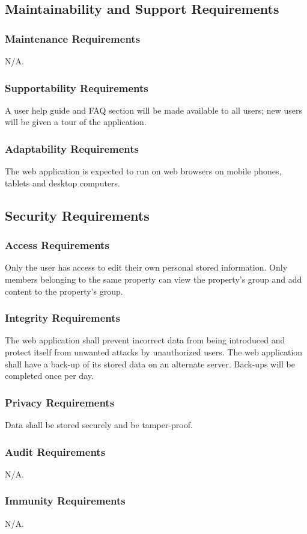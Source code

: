 \documentclass[12pt]{article}
\begin{document}
{\subsection{Maintainability and Support Requirements}
\subsubsection{Maintenance Requirements}
N/A.
\subsubsection{Supportability Requirements}
A user help guide and FAQ section will be made available to all users; new users will be given a tour of the application.
\subsubsection{Adaptability Requirements}
The web application is expected to run on web browsers on mobile phones, tablets 
and desktop computers.
\subsection{Security Requirements}
\subsubsection{Access Requirements}
Only the user has access to edit their own personal stored information. Only members belonging 
to the same property can view the property's group and add content to the 
property's group.
\subsubsection{Integrity Requirements}
The web application shall prevent incorrect data from being introduced and 
protect itself from unwanted attacks by unauthorized users. The web application 
shall have a back-up of its stored data on an alternate server. Back-ups will be completed once per day.
\subsubsection{Privacy Requirements}
Data shall be stored securely and be tamper-proof.
\subsubsection{Audit Requirements}
N/A.
\subsubsection{Immunity Requirements}
N/A.
}
\end{document}
